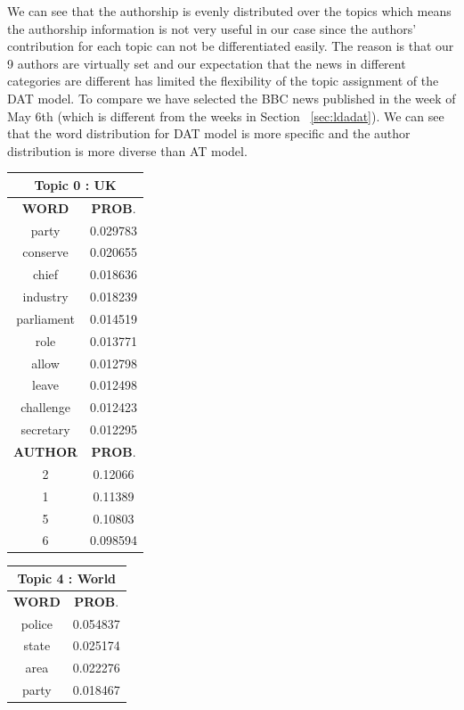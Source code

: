 We can see that the authorship is evenly distributed over the topics which means the authorship information is not very useful in our case since the authors' contribution for each topic can not be differentiated easily. The reason is that our 9 authors are virtually set and our expectation that the news in different categories are different has limited the flexibility of the topic assignment of the DAT model. To compare we have selected the BBC news published in the week of May 6th (which is different from the weeks in Section ~\ref{sec:ldadat}). We can see that the word distribution for DAT model is more specific and the author distribution is more diverse than AT model.  


\begin{table}[h!]
\centering
\begin{tabular}{|c c|} 
\hline
\multicolumn{2}{|c|}{\textbf{Topic 0 : UK}} \\
\hline
 \textbf{WORD} & \textbf{PROB}.  \\ [0.3ex] 
 \hline
 	party &  0.029783\\
	conserve  &   0.020655\\
	chief  &   0.018636\\
	industry  &   0.018239\\
	parliament  &   0.014519\\
	role  &   0.013771\\
	allow  &   0.012798\\
	leave  &   0.012498\\
	challenge   &  0.012423\\
	secretary   &  0.012295\\[1ex] 
 \hline
  \textbf{AUTHOR} & \textbf{PROB}.  \\ [0.3ex] 
 \hline
 2 &  0.12066\\
1  & 0.11389\\
5  & 0.10803\\
6  & 0.098594\\
 \hline
\end{tabular}
 \hfill
\begin{tabular}{|c c|} 
\hline
\multicolumn{2}{|c|}{\textbf{Topic 4 : World}} \\
\hline
 \textbf{WORD} & \textbf{PROB}.  \\ [0.3ex] 
 \hline
 	police &  0.054837\\
	state &   0.025174\\
	area &   0.022276\\
	party &   0.018467\\

\end{tabular}
\end{table}
